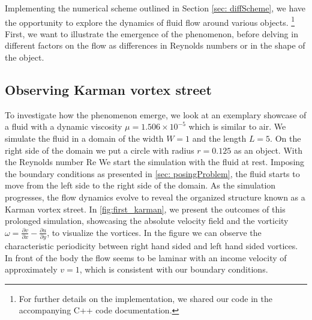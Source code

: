 Implementing the numerical scheme outlined in Section \ref{sec: diffScheme}, we have the opportunity to explore the dynamics of fluid flow around various objects. \footnote{For further details on the implementation, we shared our code in the accompanying C++ code documentation.} First, we want to illustrate the emergence of the phenomenon, before delving in different factors on the flow as differences in Reynolds numbers or in the shape of the object.

\subsection{Observing Karman vortex street}
To investigate how the phenomenon emerge, we look at an exemplary showcase of a fluid with a dynamic viscosity $\mu = 1.506 \times 10^{-5}$ which is similar to air. We simulate the fluid in a domain of the width $W = 1$ and the length $L = 5$. On the right side of the domain we put a circle with radius $r = 0.125$ as an object. With the Reynolds number Re We start the simulation with the fluid at rest. Imposing the boundary conditions as presented in \cref{sec: posingProblem}, the fluid starts to move from the left side to the right side of the domain.
As the simulation progresses, the flow dynamics evolve to reveal the organized structure known as a Karman vortex street. In \cref{fig:first_karman}, we present the outcomes of this prolonged simulation, showcasing the absolute velocity field and the vorticity $ \omega = \frac{\partial v}{\partial x} - \frac{\partial u}{\partial y}$, to visualize the vortices. In the figure we can observe the characteristic periodicity between right hand sided and left hand sided vortices. In front of the body the flow seems to be laminar with an income velocity of approximately $v = 1$, which is consistent with our boundary conditions.
